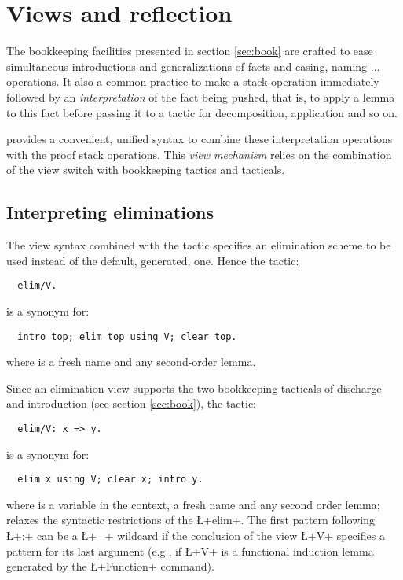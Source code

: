 \section{Views and reflection}\label{sec:views}

The bookkeeping facilities presented in section \ref{sec:book} are
crafted to ease simultaneous introductions and generalizations of facts and
casing,
naming $\dots$ operations. It also a common practice to make a stack
operation immediately followed by an \emph{interpretation} of the fact
being pushed,
that is, to apply a lemma to this fact before passing it
to a tactic for decomposition, application and so on.




\ssr{} provides a convenient, unified syntax to combine these
interpretation operations with the proof stack operations. This
\emph{view mechanism} relies on the combination of the \C{/} view
switch with bookkeeping tactics and tacticals.

\subsection{Interpreting eliminations}

The view syntax combined with the  tactic specifies an
elimination scheme to
be used instead of the default, generated, one. Hence the \ssr{} tactic:
\begin{lstlisting}
  elim/V.
\end{lstlisting}
is a synonym for:
\begin{lstlisting}
  intro top; elim top using V; clear top.
\end{lstlisting}
where  is a fresh name and  any second-order lemma.

Since an elimination view supports the two bookkeeping tacticals of
discharge and introduction (see section \ref{sec:book}), the \ssr{} tactic:
\begin{lstlisting}
  elim/V: x => y.
\end{lstlisting}
is a synonym for:
\begin{lstlisting}
  elim x using V; clear x; intro y.
\end{lstlisting}
where  is a variable in the context,  a fresh name and 
any second order lemma; \ssr{} relaxes the syntactic restrictions of
the \Coq{} \L+elim+. The first pattern following \L+:+ can be a \L+_+
wildcard if the conclusion of the view \L+V+ specifies a pattern for
its last argument (e.g., if \L+V+ is a functional induction lemma
generated by the \L+Function+ command).

